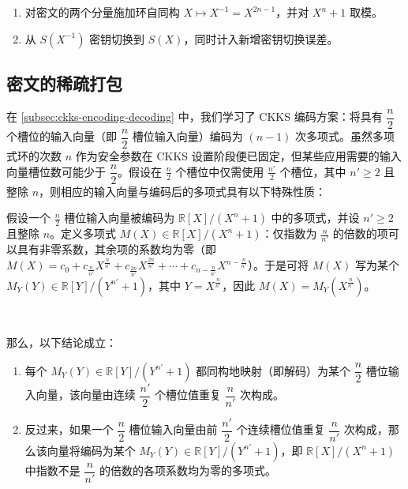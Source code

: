 \begin{tcolorbox}[title={\textbf{\tboxlabel{\ref*{subsec:ckks-conjugation}} CKKS 同态共轭}}]
\begin{enumerate}
\item 对密文的两个分量施加环自同构 $X\mapsto X^{-1}=X^{2n-1}$，并对 $X^n+1$ 取模。
\item 从 $S(X^{-1})$ 密钥切换到 $S(X)$，同时计入新增密钥切换误差。
\end{enumerate}
\end{tcolorbox}

\subsection{密文的稀疏打包}
\label{subsec:ckks-sparse-packing}

在 \autoref{subsec:ckks-encoding-decoding} 中，我们学习了 CKKS 编码方案：将具有 $\dfrac{n}{2}$ 个槽位的输入向量（即 $\dfrac{n}{2}$ 槽位输入向量）编码为 $(n-1)$ 次多项式。虽然多项式环的次数 $n$ 作为安全参数在 CKKS 设置阶段便已固定，但某些应用需要的输入向量槽位数可能少于 $\dfrac{n}{2}$。假设在 $\frac{n}{2}$ 个槽位中仅需使用 $\frac{n'}{2}$ 个槽位，其中 $n'\geq2$ 且整除 $n$，则相应的输入向量与编码后的多项式具有以下特殊性质：


\begin{tcolorbox}[title={\textbf{\tboxlabel{\ref*{subsec:ckks-sparse-packing}} CKKS 的稀疏打包多项式与密文}}]

假设一个 $\frac{n}{2}$ 槽位输入向量被编码为 $\mathbb{R}[X] / (X^n + 1)$ 中的多项式，并设 $n'\geq2$ 且整除 $n$。定义多项式 $M(X) \in \mathbb{R}[X] / (X^n + 1)$：仅指数为 $\frac{n}{n'}$ 的倍数的项可以具有非零系数，其余项的系数均为零（即 $M(X) = c_0 + c_{\frac{n}{n'}}X^{\frac{n}{n'}} + c_{\frac{2n}{n'}}X^{\frac{2n}{n'}} + \cdots + c_{n - \frac{n}{n'}}X^{n - \frac{n}{n'}}$）。于是可将 $M(X)$ 写为某个 $M_Y(Y) \in \mathbb{R}[Y] / (Y^{n'} + 1)$，其中 $Y = X^{\frac{n}{n'}}$，因此 $M(X) = M_Y(X^{\frac{n}{n'}})$。

$ $

那么，以下结论成立：

\begin{enumerate}
    \item 每个 $M_Y(Y) \in \mathbb{R}[Y]/(Y^{n'} + 1)$ 都同构地映射（即解码）为某个 $\dfrac{n}{2}$ 槽位输入向量，该向量由连续 $\dfrac{n'}{2}$ 个槽位值重复 $\dfrac{n}{n'}$ 次构成。
    \item 反过来，如果一个 $\dfrac{n}{2}$ 槽位输入向量由前 $\dfrac{n'}{2}$ 个连续槽位值重复 $\dfrac{n}{n'}$ 次构成，那么该向量将编码为某个 $M_Y(Y) \in \mathbb{R}[Y] / (Y^{n'} + 1)$，即 $\mathbb{R}[X] / (X^n + 1)$ 中指数不是 $\dfrac{n}{n'}$ 的倍数的各项系数均为零的多项式。
\end{enumerate}

\end{tcolorbox}

